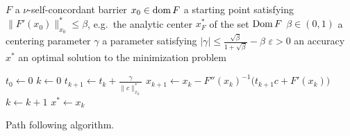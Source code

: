 \begin{algorithm}[ht]
  \begin{algorithmic}[1]
    \Require
      \Statex $F$ a $\nu$-self-concordant barrier
      \Statex $x_0 \in \operatorname{dom} F$ a starting point satisfying $\|F'(x_0)\|^*_{x_0} \leq \beta$, e.g.\ the analytic center $x^*_F$ of the set $\operatorname{Dom} F$
      \Statex $\beta \in (0,1)$ a centering parameter
      \Statex $\gamma$ a parameter satisfying $|\gamma| \leq \frac{\sqrt{\beta}}{1+\sqrt{\beta}} - \beta$
      \Statex $\varepsilon > 0$ an accuracy
    \Ensure
      \Statex $x^*$ an optimal solution to the minimization problem 
      \Statex

    \State $t_0 \gets 0$
    \State $k \gets 0$
      \State $t_{k+1} \gets t_k + \frac{\gamma}{\|c\|^*_{x_k}}$
      \State $x_{k+1} \gets x_k - F''(x_k)^{-1}\big(t_{k+1}c + F'(x_k)\big)$
      \State $k \gets k + 1$
    \EndWhile
    \State \Return $x^* \gets x_k$

  \end{algorithmic}
  \caption{Path following algorithm.}
\end{algorithm}

